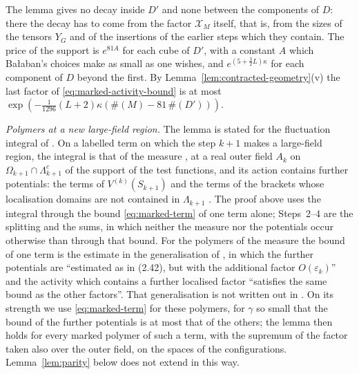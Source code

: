 \documentclass[11pt]{preprint}
\numberwithin{equation}{section}
\theoremstyle{definition}
\theoremstyle{remark}
\theoremstyle{plain}
\begin{document}
The lemma gives no decay inside $D'$ and none between the components of $D$: there the decay has to come from the factor $\mathcal X_M$ itself, that is, from the sizes of the tensors $Y_G$ and of the insertions of the earlier steps which they contain. The price of the support is $e^{81A}$ for each cube of $D'$, with a constant $A$ which Ba{\l}aban's choices make as small as one wishes, and $e^{(5 + \frac32L)\kappa}$ for each component of $D$ beyond the first. By Lemma~\ref{lem:contracted-geometry}(v) the last factor of \eqref{eq:marked-activity-bound} is at most $\exp(-\frac{1}{1296}(L + 2)\kappa(\#(M) - 81\,\#(D')))$.

\emph{Polymers at a new large-field region.} The lemma is stated for the fluctuation integral of \cite[Sect.~2]{BalabanRG2}. On a labelled term on which the step $k + 1$ makes a large-field region, the integral is that of the measure \cite[(3.27)]{BalabanCRE}, at a real outer field $A_k$ on $\Omega_{k+1} \cap \Lambda_{k+1}^c$ of the support of the test functions, and its action contains further potentials: the terms of $V^{(k)}(S_{k+1})$ and the terms of the brackets whose localisation domains are not contained in $\Lambda_{k+1}$ \cite[pp.~276--277]{BalabanCRE}. The proof above uses the integral through the bound \eqref{eq:marked-term} of one term alone; Steps~2--4 are the splitting and the sums, in which neither the measure nor the potentials occur otherwise than through that bound. For the polymers of the measure \cite[(3.27)]{BalabanCRE} the bound of one term is the estimate \cite[(2.26)]{BalabanRG2} in the generalisation of \cite[p.~277]{BalabanCRE}, in which the further potentials are ``estimated as in (2.42), but with the additional factor $O(\varepsilon_k)$'' and the activity which contains a further localised factor ``satisfies the same bound as the other factors''. That generalisation is not written out in \cite{BalabanCRE}. On its strength we use \eqref{eq:marked-term} for these polymers, for $\gamma$ so small that the bound of the further potentials is at most that of the others; the lemma then holds for every marked polymer of such a term, with the supremum of the factor taken also over the outer field, on the spaces \cite[(3.43)]{BalabanCRE} of the configurations. Lemma~\ref{lem:parity} below does not extend in this way.
\end{document}
